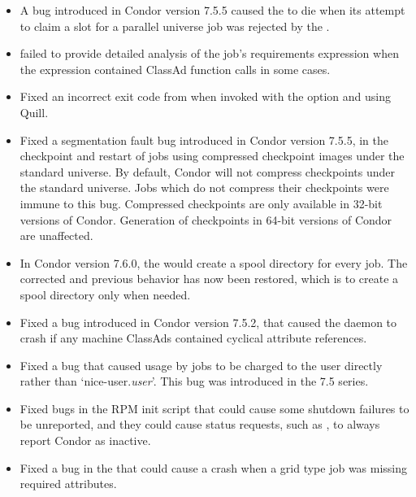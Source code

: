 \begin{itemize}

\item A bug introduced in Condor version 7.5.5 caused the 
to die when its attempt to claim a slot for a parallel universe job 
was rejected by the . 

\item {}  failed to provide detailed analysis of
the job's requirements expression when the expression contained ClassAd
function calls in some cases. 

\item Fixed an incorrect exit code from  
when invoked with the  option and using Quill.

\item Fixed a segmentation fault bug introduced in Condor version 7.5.5,
in the checkpoint and restart of jobs using compressed checkpoint images
under the standard universe.
By default, Condor will not compress checkpoints under the standard universe.
Jobs which do not compress their checkpoints were immune to this bug.  
Compressed checkpoints are only available in 32-bit versions of Condor.
Generation of checkpoints in 64-bit versions of Condor are unaffected.

\item In Condor version 7.6.0, the  would create a 
spool directory for every job. The corrected and previous behavior 
has now been restored, 
which is to create a spool directory only when needed.

\item Fixed a bug introduced in Condor version 7.5.2,
that caused the  daemon to crash
if any machine ClassAds contained cyclical attribute references.

\item Fixed a bug that caused usage by  jobs to
be charged to the user directly rather than `nice-user.\emph{user}'.
This bug was introduced in the 7.5 series.

\item Fixed bugs in the RPM init script that could cause some 
shutdown failures to be unreported, 
and they could cause status requests,
such as ,
to always report Condor as inactive.

\item Fixed a bug in the  that could cause a crash 
when a grid type  job was missing required attributes.


\end{itemize}
